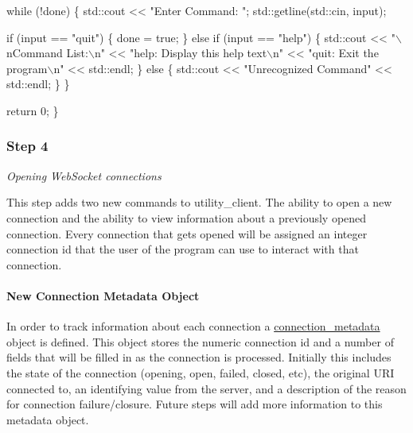 \begin{DoxyCode}
    \textcolor{keywordflow}{while} (!done) \{
        std::cout << \textcolor{stringliteral}{"Enter Command: "};
        std::getline(std::cin, input);

        \textcolor{keywordflow}{if} (input == \textcolor{stringliteral}{"quit"}) \{
            done = \textcolor{keyword}{true};
        \} \textcolor{keywordflow}{else} \textcolor{keywordflow}{if} (input == \textcolor{stringliteral}{"help"}) \{
            std::cout
                << \textcolor{stringliteral}{"\(\backslash\)nCommand List:\(\backslash\)n"}
                << \textcolor{stringliteral}{"help: Display this help text\(\backslash\)n"}
                << \textcolor{stringliteral}{"quit: Exit the program\(\backslash\)n"}
                << std::endl;
        \} \textcolor{keywordflow}{else} \{
            std::cout << \textcolor{stringliteral}{"Unrecognized Command"} << std::endl;
        \}
    \}

    \textcolor{keywordflow}{return} 0;
\}
\end{DoxyCode}


\subsubsection*{Step 4}

{\itshape Opening Web\+Socket connections}

This step adds two new commands to utility\+\_\+client. The ability to open a new connection and the ability to view information about a previously opened connection. Every connection that gets opened will be assigned an integer connection id that the user of the program can use to interact with that connection.

\paragraph*{New Connection Metadata Object}

In order to track information about each connection a {\ttfamily \hyperlink{classconnection__metadata}{connection\+\_\+metadata}} object is defined. This object stores the numeric connection id and a number of fields that will be filled in as the connection is processed. Initially this includes the state of the connection (opening, open, failed, closed, etc), the original U\+RI connected to, an identifying value from the server, and a description of the reason for connection failure/closure. Future steps will add more information to this metadata object.

